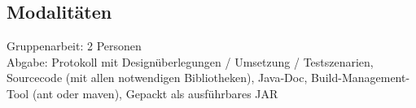 \documentclass[letterpaper, 12pt]{article}
\let\tempsubsection\subsection
\renewcommand\subsection[1]{\vspace{0cm}\tempsubsection{#1}\vspace{0cm}}
\begin{document}
\subsection{Modalitäten}
Gruppenarbeit: 2 Personen \\
Abgabe: Protokoll mit Designüberlegungen / Umsetzung / Testszenarien, Sourcecode (mit allen notwendigen Bibliotheken), Java-Doc, Build-Management-Tool (ant oder maven), Gepackt als ausführbares JAR

\clearpage



\lstlistoflistings
\listoffigures
\end{document}
